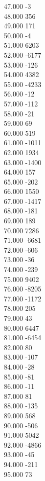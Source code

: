 { 47.000	-3 \\
 48.000	356 \\
 49.000	171 \\
 50.000	-4 \\
 51.000	6203 \\
 52.000	-6177 \\
 53.000	-126 \\
 54.000	4382 \\
 55.000	-4233 \\
 56.000	-12 \\
 57.000	-112 \\
 58.000	-21 \\
 59.000	69 \\
 60.000	519 \\
 61.000	-1011 \\
 62.000	1934 \\
 63.000	-1400 \\
 64.000	157 \\
 65.000	-202 \\
 66.000	1550 \\
 67.000	-1417 \\
 68.000	-181 \\
 69.000	189 \\
 70.000	7286 \\
 71.000	-6681 \\
 72.000	-606 \\
 73.000	-36 \\
 74.000	-239 \\
 75.000	9402 \\
 76.000	-8205 \\
 77.000	-1172 \\
 78.000	205 \\
 79.000	43 \\
 80.000	6447 \\
 81.000	-6454 \\
 82.000	80 \\
 83.000	-107 \\
 84.000	-28 \\
 85.000	-81 \\
 86.000	-11 \\
 87.000	81 \\
 88.000	-135 \\
 89.000	568 \\
 90.000	-506 \\
 91.000	5042 \\
 92.000	-4866 \\
 93.000	-45 \\
 94.000	-211 \\
 95.000	73 \\
}
